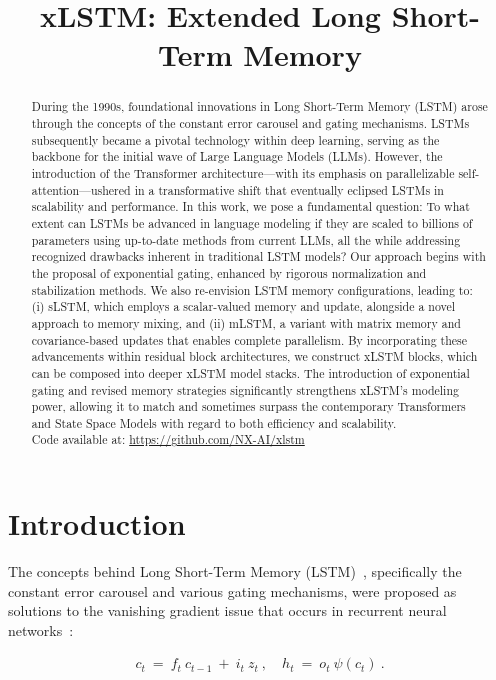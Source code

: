 \title{xLSTM: Extended Long Short-Term Memory}

\begin{abstract}
During the 1990s, foundational innovations in Long Short-Term Memory (LSTM) arose through the concepts of the constant error carousel and gating mechanisms. LSTMs subsequently became a pivotal technology within deep learning, serving as the backbone for the initial wave of Large Language Models (LLMs). However, the introduction of the Transformer architecture—with its emphasis on parallelizable self-attention—ushered in a transformative shift that eventually eclipsed LSTMs in scalability and performance. In this work, we pose a fundamental question: To what extent can LSTMs be advanced in language modeling if they are scaled to billions of parameters using up-to-date methods from current LLMs, all the while addressing recognized drawbacks inherent in traditional LSTM models? Our approach begins with the proposal of exponential gating, enhanced by rigorous normalization and stabilization methods. We also re-envision LSTM memory configurations, leading to: (i) sLSTM, which employs a scalar-valued memory and update, alongside a novel approach to memory mixing, and (ii) mLSTM, a variant with matrix memory and covariance-based updates that enables complete parallelism. By incorporating these advancements within residual block architectures, we construct xLSTM blocks, which can be composed into deeper xLSTM model stacks. The introduction of exponential gating and revised memory strategies significantly strengthens xLSTM’s modeling power, allowing it to match and sometimes surpass the contemporary Transformers and State Space Models with regard to both efficiency and scalability.\\
Code available at: \url{https://github.com/NX-AI/xlstm}
\end{abstract}

\section{Introduction}
\label{sec:intro}

The concepts behind Long Short-Term Memory (LSTM)~\citep{Hochreiter:91,Hochreiter:97nips,Hochreiter:97}, specifically the constant error carousel and various gating mechanisms, were proposed as solutions to the vanishing gradient issue that occurs in recurrent neural networks~\citep{Hochreiter:91,Hochreiter:00book}:

\begin{align}
\label{eq:lstm_idea}
  c_t \ = \ f_t \ c_{t-1} \ + \ 
          i_t \  z_t \ , \quad  
          h_t \ = \ o_t \ \psi({c_t}) \ . 
\end{align}

